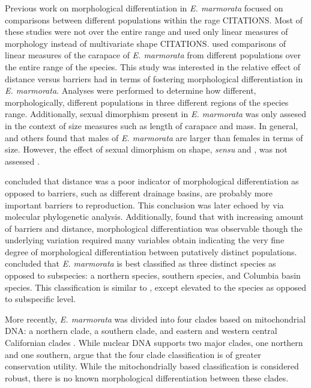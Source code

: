 \documentclass[12pt,letterpaper]{article}\usepackage{graphicx, color}
\begin{document}
Previous work on morphological differentiation in \textit{E. marmorata} focused on comparisons between different populations within the rage CITATIONS. Most of these studies were not over the entire range and used only linear measures of morphology instead of multivariate shape CITATIONS.
%
\citet{Holland1992} used comparisons of linear measures of the carapace of \textit{E. marmorata} from different populations over the entire range of the species. This study was interested in the relative effect of distance versus barriers had in terms of fostering morphological differentiation in \textit{E. marmorata}. Analyses were performed to determine how different, morphologically, different populations in three different regions of the species range. Additionally, sexual dimorphism present in \textit{E. marmorata} was only assesed in the context of size measures such as length of carapace and mass. In general, \citet{Holland1992} and others \citep{Lubcke2007,Germano2008} found that males of \textit{E. marmorata} are larger than females in terms of size. However, the effect of sexual dimorphism on shape, \textit{sensu} \citet{Kendall1977a} and \citet{Dryden1998a}, was not assessed \citep{Holland1992,Lubcke2007,Germano2008}.

\citet{Holland1992} concluded that distance was a poor indicator of morphological differentiation as opposed to barriers, such as different drainage basins, are probably more important barriers to reproduction. This conclusion was later echoed by \citet{Spinks2005} via molecular phylogenetic analysis. Additionally, \citet{Holland1992} found that with increasing amount of barriers and distance, morphological differentiation was observable though the underlying variation required many variables obtain indicating the very fine degree of morphological differentiation between putatively distinct populations. \citet{Holland1992} concluded that \textit{E. marmorata} is best classified as three distinct species as opposed to subspecies: a northern species, southern species, and Columbia basin species. This classification is similar to \citet{Seeliger1945}, except elevated to the species as opposed to subspecific level.


More recently, \textit{E. marmorata} was divided into four clades based on mitochondrial DNA: a northern clade, a southern clade, and eastern and western central Californian clades \citep{Spinks2005,Spinks2010}. While nuclear DNA supports two major clades, one northern and one southern, \citet{Spinks2010} argue that the four clade classification is of greater conservation utility. 
While the mitochondrially based classification is considered robust, there is no known morphological differentiation between these clades.
\end{document}
